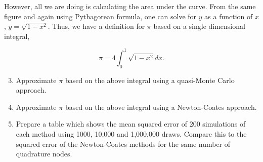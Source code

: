 \documentclass{article}
\begin{document}
However, all we are doing is calculating the area under the curve. From the same figure and again using Pythagorean formula, one can solve for $y$ as a function of $x$, $y = \sqrt{1 - x^2}$. Thus, we have a definition for $\pi$ based on a single dimensional integral, 

$$ \pi = 4 \int_0^1 \sqrt{1 - x^2} dx .$$

\begin{enumerate}
\setcounter{enumi}{2}
\item Approximate $\pi$ based on the above integral using a quasi-Monte Carlo approach. 

\item Approximate $\pi$ based on the above integral using a Newton-Coates approach. 

\item Prepare a table which shows the mean squared error of 200 simulations of each method using 1000, 10,000 and 1,000,000 draws. 
Compare this to the squared error of the Newton-Coates methods for the same number of quadrature nodes.

\end{enumerate}
\end{document}
